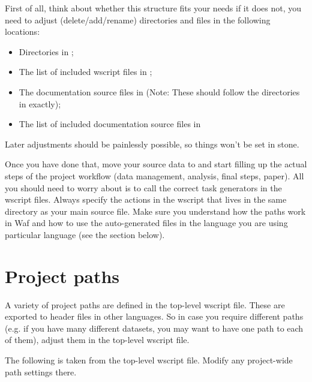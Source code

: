 \documentclass[a4paper,11pt,english]{sphinxmanual}
\begin{document}
First of all, think about whether this structure fits your needs \textendash{} if it does not, you need to adjust (delete/add/rename) directories and files in the following locations:
\begin{itemize}
\item {} 
Directories in ;

\item {} 
The list of included wscript files in ;

\item {} 
The documentation source files in  (Note: These should follow the directories in  exactly);

\item {} 
The list of included documentation source files in 

\end{itemize}

Later adjustments should be painlessly possible, so things won’t be set in stone.

Once you have done that, move your source data to  and start filling up the actual steps of the project workflow (data management, analysis, final steps, paper). All you should need to worry about is to call the correct task generators in the wscript files. Always specify the actions in the wscript that lives in the same directory as your main source file. Make sure you understand how the paths work in Waf and how to use the auto-generated files in the language you are using particular language (see the section {\hyperref[\detokenize{introduction:project-paths}]{}} below).


\section{Project paths}
\label{\detokenize{introduction:project-paths}}\label{\detokenize{introduction:id5}}
A variety of project paths are defined in the top-level wscript file. These are exported to header files in other languages. So in case you require different paths (e.g. if you have many different datasets, you may want to have one path to each of them), adjust them in the top-level wscript file.

The following is taken from the top-level wscript file. Modify any project-wide path settings there.
\end{document}
